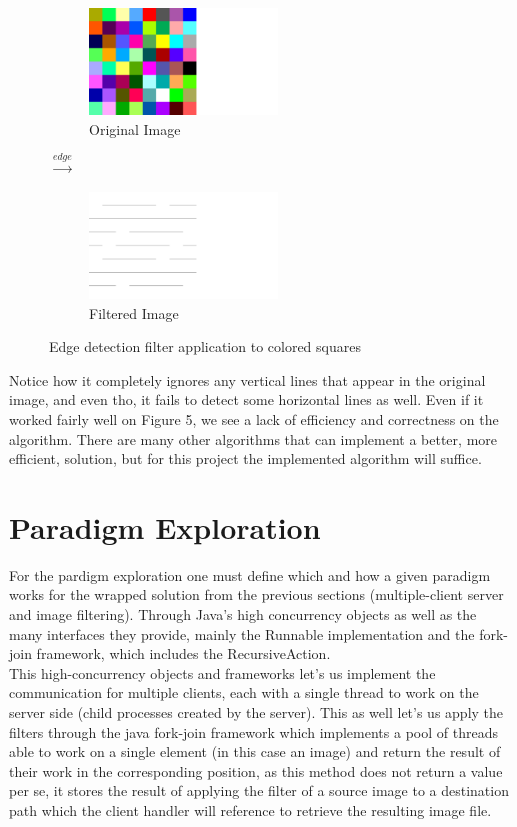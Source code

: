 \documentclass[a4paper,12pt]{article}
\begin{document}
	\begin{figure}[H]
		\centering
		\begin{subfigure}{.47\textwidth}
			\centering
			\includegraphics[width=5cm]{coloredsquares.png}
			\caption{Original Image}
		\end{subfigure}%
		{\LARGE$\xrightarrow{edge}$}%
		\begin{subfigure}{.47\textwidth}
			\centering
			\includegraphics[width=5cm]{jv_edge_coloredsquares.png}
			\caption{Filtered Image}
		\end{subfigure}

		\caption{Edge detection filter application to colored squares}
	\end{figure}	
	
	Notice how it completely ignores any vertical lines that appear in the original image, and even tho, it fails to detect some horizontal lines as well. Even if it worked fairly well on Figure 5, we see a lack of efficiency and correctness on the algorithm. There are many other algorithms that can implement a better, more efficient, solution, but for this project the implemented algorithm will suffice. 
	
	\section{Paradigm Exploration}	
	
	For the pardigm exploration one must define which and how a given paradigm works for the wrapped solution from the previous sections (multiple-client server and image filtering). Through Java's high concurrency objects as well as the many interfaces they provide, mainly the Runnable implementation and the fork-join framework, which includes the RecursiveAction.\\
	
	This high-concurrency objects and frameworks let's us implement the communication for multiple clients, each with a single thread to work on the server side (child processes created by the server). This as well let's us apply the filters through the java fork-join framework which implements a pool of threads able to work on a single element (in this case an image) and return the result of their work in the corresponding position, as this method does not return a value per se, it stores the result of applying the filter of a source image to a destination path which the client handler will reference to retrieve the resulting image file.
	
\end{document}
